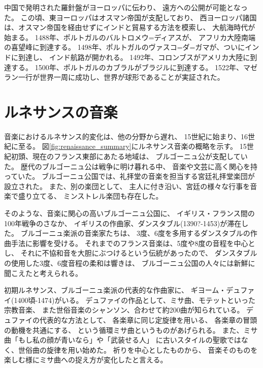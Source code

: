 \documentclass[a4j]{jarticle}
\begin{document}
中国で発明された羅針盤がヨーロッパに伝わり、
遠方への公開が可能となった。
この頃、東ヨーロッパはオスマン帝国が支配しており、
西ヨーロッパ諸国は、オスマン帝国を経由せずにインドと貿易する方法を模索し、
大航海時代が始まる。
1488年、ポルトガルのバルトロメウ=ディアスが、
アフリカ大陸南端の喜望峰に到達する。
1498年、ポルトガルのヴァスコ=ダ=ガマが、ついにインドに到達し、
インド航路が開かれる。
1492年、コロンブスがアメリカ大陸に到達する。
1500年、ポルトガルのカブラルがブラジルに到達する。
1522年、マゼラン一行が世界一周に成功し、世界が球形であることが実証された。





\section{ルネサンスの音楽}

音楽におけるルネサンス的変化は、他の分野から遅れ、
15世紀に始まり、16世紀に至る。
図\ref{fig:renaissance_summary}にルネサンス音楽の概略を示す。
15世紀初頭、現在のフランス東部にあたる地域は、
ブルゴーニュ公が支配していた。
歴代のブルゴーニュ公は戦争に明け暮れる中、
音楽や文芸に高く関心を持っていた。
ブルゴーニュ公国では、礼拝堂の音楽を担当する宮廷礼拝堂楽団が設立された。
また、別の楽団として、
主人に付き沿い、宮廷の様々な行事を音楽で盛り立てる、
ミンストレル楽団も存在した。

そのような、音楽に関心の高いブルゴーニュ公国に、
イギリス・フランス間の100年戦争のさなか、
イギリスの作曲家、ダンスタブル(1390?-1453)が滞在した。
ブルゴーニュ楽派の音楽家たちは、
3度、6度を多用するダンスタブルの作曲手法に影響を受ける。
それまでのフランス音楽は、5度や8度の音程を中心とし、
それに不協和音を大胆にぶつけるという伝統があったので、
ダンスタブルの使用した3度、6度音程の柔和は響きは、
ブルゴーニュ公国の人々には新鮮に聞こえたと考えられる。

初期ルネサンス、ブルゴーニュ楽派の代表的な作曲家に、
ギヨーム・デュファイ(1400頃-1474)がいる。
デュファイの作品として、ミサ曲、モテットといった宗教音楽、
また世俗音楽のシャンソン、合わせて約200曲が知られている。
デュファイの代表的な方法として、
各楽章に同じ定旋律を用いる、
各楽章の冒頭の動機を共通にする、
という循環ミサ曲というものがあげられる。
また、ミサ曲「もし私の顔が青いなら」や「武装せる人」
に古いスタイルの聖歌ではなく、世俗曲の旋律を用い始めた。
祈りを中心としたものから、
音楽そのものを楽しむ様にミサ曲への捉え方が変化したと言える。
\end{document}
